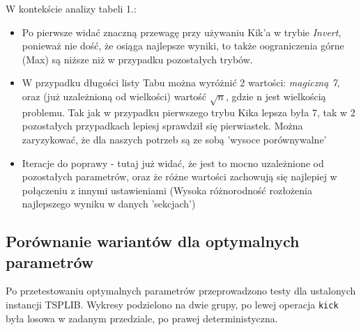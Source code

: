 \documentclass{article}
\begin{document}
W kontekście analizy tabeli 1.:
\begin{itemize}
	\item Po pierwsze widać znaczną przewagę przy używaniu Kik'a w trybie \textit{Invert}, ponieważ nie dość, że osiąga najlepsze wyniki, to także oograniczenia górne (Max) są niższe niż w przypadku pozostałych trybów.
	\item W przypadku długości listy Tabu można wyróżnić 2 wartości: \textit{magiczną 7}, oraz (już uzależnioną od wielkości) wartość $\sqrt{n}$, gdzie n jest wielkością problemu. Tak jak w przypadku pierwszego trybu Kika lepsza była 7, tak w 2 pozostałych przypadkach lepiesj sprawdził się pierwiastek. Można zaryzykować, że dla naszych potrzeb są ze sobą 'wysoce porównywalne'
	\item Iteracje do poprawy - tutaj już widać, że jest to mocno uzależnione od pozostałych parametrów, oraz że różne wartości zachowują się najlepiej w połączeniu z innymi ustawieniami (Wysoka różnorodność rozłożenia najlepszego wyniku w danych 'sekcjach')
\end{itemize}

\newpage
\subsection{Porównanie wariantów dla optymalnych parametrów}

Po przetestowaniu optymalnych parametrów przeprowadzono testy dla ustalonych instancji TSPLIB. Wykresy podzielono na dwie grupy, po lewej operacja \texttt{kick} była losowa w zadanym przedziale, po prawej deterministyczna.
\\
\end{document}
